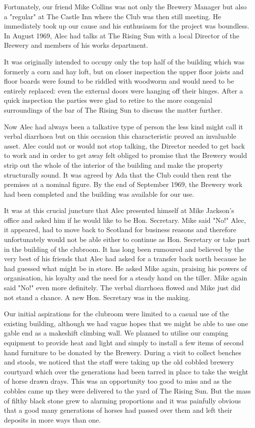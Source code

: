 \documentclass[a5paper,openany,font 10pt]{scrbook}
\begin{document}
Fortunately, our friend Mike Collins was not only the
Brewery Manager but also a "regular" at The Castle Inn where the
Club was then still meeting. He immediately took up our cause and
his enthusiasm for the project was boundless. In August 1969,
Alec had talks at The Rising Sun with a local Director of the
Brewery and members of his works department.

It was originally intended to occupy only the top half of
the building which was formerly a corn and hay loft, but on
closer inspection the upper floor joists and floor boards were
found to be riddled with woodworm and would need to be entirely
replaced: even the external doors were hanging off their hinges.
After a quick inspection the parties were glad to retire to the
more congenial surroundings of the bar of The Rising Sun to
discuss the matter further.

Now Alec had always been a talkative type of person  the
less kind might call it verbal diarrhoea  but on this occasion
this characteristic proved an invaluable asset. Alec could not or
would not stop talking, the Director needed to get back to work
and in order to get away felt obliged to promise that the Brewery
would strip out the whole of the interior of the building and
make the property structurally sound. It was agreed by Ada that
the Club could then rent the premises at a nominal figure. By the
end of September 1969, the Brewery work had been completed and
the building was available for our use.

It was at this crucial juncture that Alec presented himself
at Mike Jackson's office and asked him if he would like to be
Hon. Secretary. Mike said "No!"  Alec, it appeared, had to move
back to Scotland for business reasons and therefore unfortunately
would not be able either to continue as Hon. Secretary or take
part in the building of the clubroom. It has long been rumoured
 and believed by the very best of his friends  that Alec had
asked for a transfer back north because he had guessed what might
be in store. He asked Mike again, praising his powers of
organisation, his loyalty and the need for a steady hand on the
tiller. Mike again said "No!"   even more definitely. The verbal
diarrhoea flowed and Mike just did not stand a chance. A new Hon.
Secretary was in the making.

Our initial aspirations for the clubroom were limited to a
casual use of the existing building, although we had vague hopes
that we might be able to use one gable end as a makeshift
climbing wall. We planned to utilise our camping equipment to
provide heat and light and simply to install a few items of
second hand furniture to be donated by the Brewery. During a
visit to collect benches and stools, we noticed that the staff
were taking up the old cobbled brewery courtyard which over the
generations had been tarred in place to take the weight of horse
drawn drays. This was an opportunity too good to miss and as the
cobbles came up they were delivered to the yard of The Rising
Sun. But the mass of filthy black stone grew to alarming
proportions and it was painfully obvious that a good many
generations of horses had passed over them and left their
deposits in more ways than one.
\end{document}
